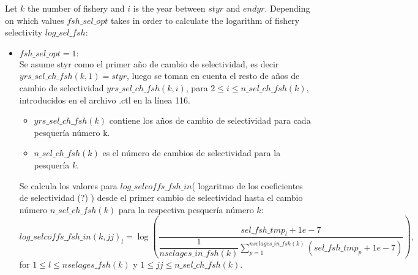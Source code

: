 \documentclass{article}
\begin{document}
Let $k$ the number of fishery and $i$ is the year between $styr$ and $endyr$.
Depending on which values $fsh\_sel\_opt$ takes in order to calculate the logarithm of fishery selectivity $log\_sel\_fsh$:
\begin{itemize}
\item $fsh\_sel\_opt=1:$\\
Se asume styr como el primer año de cambio de selectividad, es decir $yrs\_sel\_ch\_fsh(k,1)=styr$, luego se toman en cuenta el resto de años de cambio de selectividad $yrs\_sel\_ch\_fsh(k,i)$, para $2\leq i \leq n\_sel\_ch\_fsh(k)$, introducidos en el archivo .ctl en la línea 116.
\begin{itemize}
    \item $yrs\_sel\_ch\_fsh(k)$ contiene los años de cambio de selectividad para cada pesquería número k.
    \item $n\_sel\_ch\_fsh(k)$ es el número de cambios de selectividad para la pesquería $k$.
    
\end{itemize}

Se calcula los valores para $log\_selcoffs\_fsh\_in$( logaritmo de los coeficientes de selectividad (?) ) desde el primer cambio de selectividad hasta el cambio número $n\_sel\_ch\_fsh(k)$ para la respectiva pesquería número $k$:
\begin{equation}
    log\_selcoffs\_fsh\_in(k,jj)_l=\log\left(\dfrac{sel\_fsh\_tmp_l+1e-7}{\dfrac{1}{nselages\_in\_fsh(k)}\displaystyle\sum_{p=1}^{nselages\_in\_fsh(k)}(sel\_fsh\_tmp_p+1e-7)}\right),
\end{equation}
for $1\leq l \leq nselages\_fsh(k)$ y $1\leq jj \leq n\_sel\_ch\_fsh(k)$.


\end{itemize}
\end{document}
